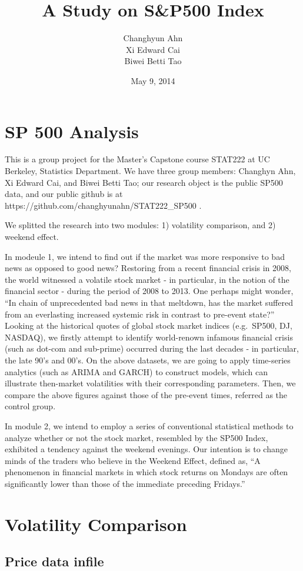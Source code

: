 \documentclass[letterpaper,10pt,english]{/Users/edwsurewin/anaconda/lib/python2.7/site-packages/sphinx/texinputs/sphinxhowto}
\title{A Study on S\&P500 Index}
\date{May 9, 2014}
\author{Changhyun Ahn\\Xi Edward Cai\\Biwei Betti Tao}
\begin{document}
        
            \maketitle
        

        


        
        \section{SP 500 Analysis}\label{sp-500-analysis}

This is a group project for the Master's Capstone course STAT222 at UC
Berkeley, Statistics Department. We have three group members: Changhyn
Ahn, Xi Edward Cai, and Biwei Betti Tao; our research object is the
public SP500 data, and our public github is at
https://github.com/changhyunahn/STAT222\_SP500 .

We splitted the research into two modules: 1) volatility comparison, and
2) weekend effect.

In modeule 1, we intend to find out if the market was more responsive to
bad news as opposed to good news? Restoring from a recent financial
crisis in 2008, the world witnessed a volatile stock market - in
particular, in the notion of the financial sector - during the period of
2008 to 2013. One perhaps might wonder, ``In chain of unprecedented bad
news in that meltdown, has the market suffered from an everlasting
increased systemic risk in contrast to pre-event state?'' Looking at the
historical quotes of global stock market indices (e.g.~SP500, DJ,
NASDAQ), we firstly attempt to identify world-renown infamous financial
crisis (such as dot-com and sub-prime) occurred during the last decades
- in particular, the late 90's and 00's. On the above datasets, we are
going to apply time-series analytics (such as ARIMA and GARCH) to
construct models, which can illustrate then-market volatilities with
their corresponding parameters. Then, we compare the above figures
against those of the pre-event times, referred as the control group.

In module 2, we intend to employ a series of conventional statistical
methods to analyze whether or not the stock market, resembled by the
SP500 Index, exhibited a tendency against the weekend evenings. Our
intention is to change minds of the traders who believe in the Weekend
Effect, defined as, ``A phenomenon in financial markets in which stock
returns on Mondays are often significantly lower than those of the
immediate preceding Fridays.''\section{Volatility Comparison}\label{volatility-comparison}\subsection{Price data infile}\label{price-data-infile}
\end{document}
